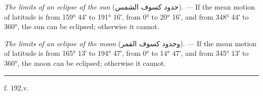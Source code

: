 \documentclass[11pt]{article}
\begin{document}
\noindent\hspace*{6mm}\parbox{\dimexpr\textwidth-12mm}{\setlength{\parindent}{6mm}\indent \textit{The limits of an eclipse of the sun} (\textarabic{حدود كسوف الشمس}). — If the mean motion of latitude is from 159° 44′ to 191° 16′, from 0° to 20° 16′, and from 348° 44′ to 360°, the sun can be eclipsed; otherwise it cannot.}\par\vspace{1mm}
\noindent\hspace*{6mm}\parbox{\dimexpr\textwidth-12mm}{\setlength{\parindent}{6mm}\indent \textit{The limits of an eclipse of the moon} (\textarabic{وحدود كسوف القمر}). — If the mean motion of latitude is from 165° 13′ to 194° 47′, from 0° to 14° 47′, and from 345° 13′ to 360°, the moon can be eclipsed; otherwise it cannot.}\par\vspace{1mm}
\clearpage
\noindent{}
\par\vspace{-1mm}\noindent\rule{\textwidth}{.4pt}\par\vspace{1mm}
\begin{center}{\small f. 192,v.}\end{center}\vspace{-3mm}
\end{document}
